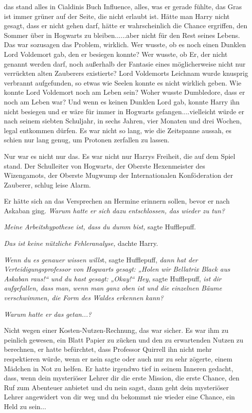 {das stand alles in Cialdinis Buch Influence, alles, was er gerade fühlte, das Gras ist immer grüner auf der Seite, die nicht erlaubt ist. Hätte man Harry nicht gesagt, dass er nicht gehen darf, hätte er wahrscheinlich die Chance ergriffen, den Sommer über in Hogwarts zu bleiben......aber nicht für den Rest seines Lebens. Das war sozusagen das Problem, wirklich. Wer wusste, ob es noch einen Dunklen Lord Voldemort gab, den er besiegen konnte? Wer wusste, ob Er, der nicht genannt werden darf, noch außerhalb der Fantasie eines möglicherweise nicht nur verrückten alten Zauberers existierte? Lord Voldemorts Leichnam wurde knusprig verbrannt aufgefunden, so etwas wie Seelen konnte es nicht wirklich geben. Wie konnte Lord Voldemort noch am Leben sein? Woher wusste Dumbledore, dass er noch am Leben war? Und wenn es keinen Dunklen Lord gab, konnte Harry ihn nicht besiegen und er wäre für immer in Hogwarts gefangen....vielleicht würde er nach seinem siebten Schuljahr, in sechs Jahren, vier Monaten und drei Wochen, legal entkommen dürfen. Es war nicht so lang, wie die Zeitspanne aussah, es schien nur lang genug, um Protonen zerfallen zu lassen.

Nur war es nicht nur das. Es war nicht nur Harrys Freiheit, die auf dem Spiel stand. Der Schulleiter von Hogwarts, der Oberste Hexenmeister des Wizengamots, der Oberste Mugwump der Internationalen Konföderation der Zauberer, schlug leise Alarm.

Er hätte sich an das Versprechen an Hermine erinnern sollen, bevor er nach Askaban ging. \emph{Warum hatte er sich dazu entschlossen, das wieder zu tun?}

\emph{Meine Arbeitshypothese ist, dass du dumm bist,} sagte Hufflepuff.

\emph{Das ist keine nützliche Fehleranalyse,} dachte Harry.

\emph{Wenn du es genauer wissen wills}t, sagte Hufflepuff, \emph{dann hat der Verteidigungsprofessor von Hogwarts gesagt: „Holen wir Bellatrix Black aus Askaban raus!“ und du hast gesagt: „Okay!“ Hey}, sagte Hufflepuff, \emph{ist dir aufgefallen, dass man, wenn man ganz oben ist und die einzelnen Bäume verschwimmen, die Form des Waldes erkennen kann?}

\emph{Warum hatte er das getan...?}

Nicht wegen einer Kosten-Nutzen-Rechnung, das war sicher. Es war ihm zu peinlich gewesen, ein Blatt Papier zu zücken und den zu erwartenden Nutzen zu berechnen, er hatte befürchtet, dass Professor Quirrell ihn nicht mehr respektieren würde, wenn er nein sagte oder auch nur zu sehr zögerte, einem Mädchen in Not zu helfen. Er hatte irgendwo tief in seinem Inneren gedacht, dass, wenn dein mysteriöser Lehrer dir die erste Mission, die erste Chance, den Ruf zum Abenteuer anbietet und du nein sagst, dann geht dein mysteriöser Lehrer angewidert von dir weg und du bekommst nie wieder eine Chance, ein Held zu sein...

}
